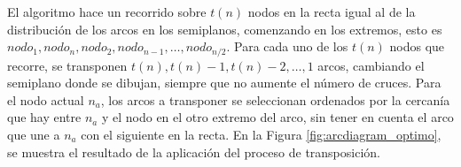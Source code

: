 	El algoritmo hace un recorrido sobre $t(n)$ nodos en la recta igual al de la distribución de los arcos en los semiplanos, comenzando en los extremos, esto es $nodo_1, nodo_n, nodo_2, nodo_{n-1}, \ldots, nodo_{n / 2}$. Para cada uno de los $t(n)$ nodos que recorre, se transponen $t(n), t(n)-1, t(n)-2, \ldots, 1$ arcos,  cambiando el  semiplano donde se dibujan, siempre que no aumente el número de cruces. Para el nodo actual $n_a$, los arcos a transponer se seleccionan ordenados por la cercanía que hay entre  $n_a$ y el nodo en el otro extremo del arco, sin tener en cuenta el  arco que une a  $n_a$ con el siguiente en la recta.
	En la Figura \ref{fig:arcdiagram_optimo}, se muestra el resultado de la  aplicación del proceso de  transposición.
	
	
